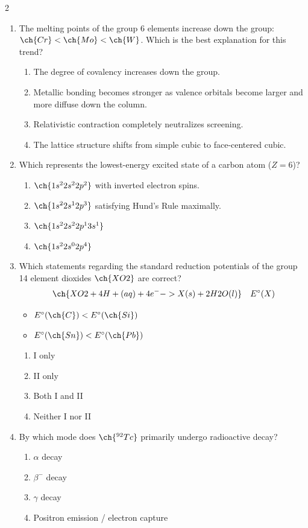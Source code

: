 \documentclass[10pt,letterpaper]{article}
\begin{document}
\begin{multicols*}{2}
\begin{enumerate}
    \item The melting points of the group 6 elements increase down the group: $\ch{Cr} < \ch{Mo} < \ch{W}$. Which is the best explanation for this trend?
    \begin{enumerate}[label=(\textsubscript{\Alph*})]
        \item The degree of covalency increases down the group.
        \item Metallic bonding becomes stronger as valence orbitals become larger and more diffuse down the column.
        \item Relativistic contraction completely neutralizes screening.
        \item The lattice structure shifts from simple cubic to face-centered cubic.
    \end{enumerate}

    \item Which represents the lowest-energy excited state of a carbon atom ($Z=6$)?
    \begin{enumerate}[label=(\textsubscript{\Alph*})]
        \item $\ch{1s^2 2s^2 2p^2}$ with inverted electron spins.
        \item $\ch{1s^2 2s^1 2p^3}$ satisfying Hund's Rule maximally.
        \item $\ch{1s^2 2s^2 2p^1 3s^1}$
        \item $\ch{1s^2 2s^0 2p^4}$
    \end{enumerate}

    \item Which statements regarding the standard reduction potentials of the group 14 element dioxides $\ch{XO2}$ are correct?
    \[ \ch{XO2 + 4 H+(aq) + 4e^{-} -> X(s) + 2 H2O(l)} \quad E^\circ(X) \]
    \begin{itemize}
        \item[I.] $E^\circ(\ch{C}) < E^\circ(\ch{Si})$
        \item[II.] $E^\circ(\ch{Sn}) < E^\circ(\ch{Pb})$
    \end{itemize}
    \begin{enumerate}[label=(\textsubscript{\Alph*})]
        \item I only
        \item II only
        \item Both I and II
        \item Neither I nor II
    \end{enumerate}

    \item By which mode does $\ch{^{92}Tc}$ primarily undergo radioactive decay?
    \begin{enumerate}[label=(\textsubscript{\Alph*})]
        \item $\alpha$ decay
        \item $\beta^-$ decay
        \item $\gamma$ decay
        \item Positron emission / electron capture
    \end{enumerate}


\end{enumerate}
\end{multicols*}
\end{document}
